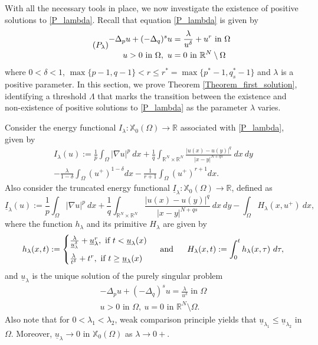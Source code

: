 \documentclass[reqno,oneside]{amsart}
\theoremstyle{definition}
\theoremstyle{remark}
\numberwithin{equation}{section}
\newcommand{\Om} {\Omega}
\newcommand{\sr}{\mathbb{R}}
\newcommand{\p}{\Delta_p}
\newcommand{\qs}{(-\Delta_q)^s}
\newcommand{\bdry}{\mathbb{R}^N \setminus \Omega}
\newcommand{\rar}{\rightarrow}
\newcommand{\na} {\nabla}
\newcommand{\xo}{\mathbb{X}_0}
\newcommand{\ul}{\underline{u}}
\newcommand{\il}{\underline{I}}
\newcommand{\la} {\lambda}
\begin{document}
With all the necessary tools in place, we now investigate the existence of positive solutions to \eqref{P_lambda}. Recall that equation \eqref{P_lambda} is given by
\begin{equation}\tag{$P_{\la}$}
    \begin{aligned}
        -\p u + \qs u &= \frac{\la}{u^{\delta}} + u^r \text{ in } \Om\\
        u>0 \text{ in } \Om,\ u &=0 \text{ in } \bdry
    \end{aligned}
\end{equation}
where $0< \delta <1$, $\max \{ p-1, q-1\} < r \leq r^*= \max \{p^* -1, q_s^* -1 \}$ and $\la$ is a positive parameter. In this section, we prove Theorem \ref{Theorem_first_solution}, identifying a threshold $\Lambda$ that marks the transition between the existence and non-existence of positive solutions to \eqref{P_lambda} as the parameter $\la$ varies.

Consider the energy functional $I_{\la}: \xo(\Om) \rar \sr$ associated with \eqref{P_lambda}, given by
\begin{multline}
    I_{\la}(u):=\frac{1}{p} \int_{\Om} |\na u|^p\ dx + \frac{1}{q} \int_{\sr^N \times \sr^N} \frac{|u(x)- u(y)|^q}{|x-y|^{N+qs}}\ dx\ dy\\
    - \frac{\la}{1-\delta} \int_{\Om} \left(u^+ \right)^{1- \delta} dx - \frac{1}{r+1} \int_{\Om} \left(u^+ \right)^{r+1} dx.
\end{multline}
Also consider the truncated energy functional $\il_{\la}: \xo(\Om) \rar \sr$, defined as
\begin{equation}\label{I lambda lower}
    \il_{\la} (u):=\frac{1}{p} \int_{\Om} |\na u|^p\ dx + \frac{1}{q} \int_{\sr^N \times \sr^N} \frac{|u(x)- u(y)|^q}{|x-y|^{N+qs}}\ dx\ dy - \int_{\Om} H_{\la} \left(x, u^+ \right)\ dx,
\end{equation}
where the function $h_{\la}$ and its primitive $H_{\la}$ are given by
\[ h_{\la} (x,t):= \begin{cases}
    \frac{\la}{\underline{u}_{\la}^{\delta}} + \underline{u}_{\la}^r, \text{ if } t < \underline{u}_{\la}(x)\vspace{5pt}\\
    \frac{\la}{t^{\delta}} + t^r, \text{ if } t \geq \underline{u}_{\la}(x)\\
    \end{cases} \text{ and }\ \ \ \ H_{\la}(x,t):= \int_0^t h_{\la} (x,\tau)\ d\tau,\]
and $\ul_{\la}$ is the unique solution of the purely singular problem
\begin{equation}\label{purely_singular_equation}
    \begin{aligned}
        -\p u + \qs u = \frac{\la}{u^{\delta}} \text{ in } \Om\\
        u > 0 \text{ in } \Om,\ u = 0 \text{ in } \bdry.
    \end{aligned}
\end{equation}
Also note that for $0<\la_1 < \la_2$, weak comparison principle yields that $\ul_{\la_1} \leq \ul_{\la_2}$ in $\Om$. Moreover, $\ul_{\la} \rar 0$ in $\xo(\Om)$ as $\la\rar 0+$.
\end{document}

